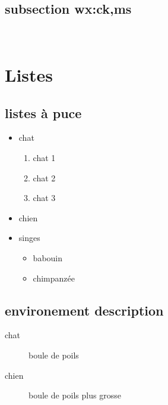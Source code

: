 \documentclass[a4paper,12pt]{article}
\begin{document}
\subsection{subsection wx:ck,ms}
\blindtext \\


\newpage
\section{Listes}
\subsection{listes à puce}


\begin{itemize}
  \renewcommand\labelitemi{X}
  \item chat
  \begin{enumerate}
    \item chat 1
    \item chat 2
    \item chat 3
  \end{enumerate}
  \item chien
  \item singes
  \begin{itemize}
    \item babouin
    \item chimpanzée
  \end{itemize}
\end{itemize}

\subsection{environement description}
\begin{description}
  \item[chat] boule de poils
  \item[chien] boule de poils plus grosse \blindtext
\end{description}


\newpage
\end{document}
